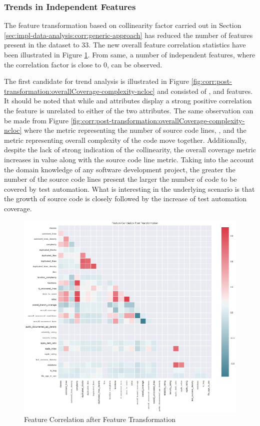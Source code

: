 \subsubsection{Trends in Independent Features}\label{sec:impl-data-analysis:independent-features}
The feature transformation based on collinearity factor carried out in Section \ref{sec:impl-data-analysis:corr:generic-approach} has reduced the number of features present in the dataset to 33. The new overall feature correlation statistics have been illustrated in Figure \ref{fig:corr:post-transformation}. From same, a number of independent features, where the correlation factor is close to 0, can be observed.

The first candidate for trend analysis is illustrated in Figure \ref{fig:corr:post-transformation:overallCoverage-complexity-ncloc} and consisted of \overallCoverage{}, \complexity{} and\ncloc{} features. It should be noted that while \ncloc{} and \complexity{} attributes display a strong positive correlation the \overallCoverage{} feature is unrelated to either of the two attributes. The same observation can be made from Figure \ref{fig:corr:post-transformation:overallCoverage-complexity-ncloc} where the metric representing the number of source code lines, \ncloc{}, and the metric representing overall complexity of the code move together. Additionally, despite the lack of strong indication of the collinearity, the overall coverage metric increases in value along with the source code line metric. Taking into the account the domain knowledge of any software development project, the greater the number of the source code lines present the larger the number of code to be covered by test automation. What is interesting in the underlying scenario is that the growth of source code is closely followed by the increase of test automation coverage. 

\begin{figure}[!h]
    \centering
    \includegraphics[scale=0.48]{Figures/correlation/Feature_Correlation_Post_Transformation.png}
    \caption{Feature Correlation after Feature Transformation}
    \label{fig:corr:post-transformation}
\end{figure}


